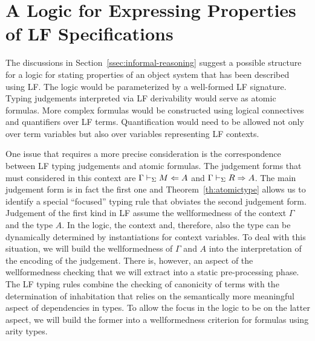 \section{A Logic for Expressing Properties of LF Specifications}
\label{sec:logic}

The discussions in Section~\ref{ssec:informal-reasoning} suggest a 
possible structure for a logic for stating properties of an object
system that has been described using LF. 
%
The logic would be parameterized by a well-formed LF signature.
%
Typing judgements interpreted via LF derivability would serve as 
atomic formulas.
%
More complex formulas would be constructed using 
logical connectives and quantifiers over LF terms.
%
Quantification would need to be allowed not only over term variables
but also over variables representing LF contexts. 

One issue that requires a more precise consideration is the
correspondence between LF typing judgements and atomic
formulas. 
%
The judgement forms that must considered in this context 
are $\Gamma \vdash_{\Sigma} M\Leftarrow A$ and $\Gamma \vdash_{\Sigma} R\Rightarrow A$.
%
The main judgement form is in fact the first one and
Theorem~\ref{th:atomictype} allows us to identify a special
``focused'' typing rule that obviates the second judgement form. 
%
Judgement of the first kind in LF assume the wellformedness of the
context $\Gamma$ and the type $A$.
%
In the logic, the context and, therefore, also the type can be
dynamically determined by instantiations for context variables.
%
To deal with this situation, we will build the wellformedness of
$\Gamma$ and $A$ into the interpretation of the encoding of the
judgement. 
%
There is, however, an aspect of the wellformedness checking that we
will extract into a static pre-processing phase.
%
The LF typing rules combine the checking of canonicity of terms with
the determination of inhabitation that relies on the semantically more
meaningful aspect of dependencies in types.
%
To allow the focus in the logic to be on the latter aspect, we will
build the former into a wellformedness criterion for formulas using
arity types.

